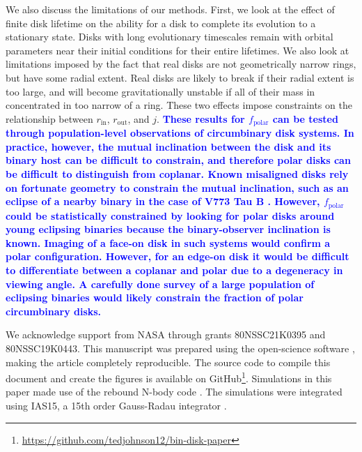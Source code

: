 \documentclass[twocolumn,linenumbers]{aastex631}
\newcommand\ghurl[0]{\url{https://github.com/tedjohnson12/bin-disk-paper}}
\newcommand{\RR}[1]{\textcolor{blue}{\bf#1}} %
\begin{document}
We also discuss the limitations of our methods. First, we look at the effect of finite disk lifetime on the ability for a disk to complete its evolution to a stationary state. Disks with long evolutionary timescales remain with orbital parameters near their initial conditions for their entire lifetimes. We also look at limitations imposed by the fact that real disks are not geometrically narrow rings, but have some radial extent. Real disks are likely to break if their radial extent is too large, and will become gravitationally unstable if all of their mass in concentrated in too narrow of a ring. These two effects impose constraints on the relationship between $r_\text{in}$, $r_\text{out}$, and $j$.
\RR{
These results for $f_\text{polar}$ can be tested through population-level observations of circumbinary disk systems. In practice, however, the mutual inclination between the disk and its binary host can be difficult to constrain, and therefore polar disks can be difficult to distinguish from coplanar. Known misaligned disks rely on fortunate geometry to constrain the mutual inclination, such as an eclipse of a nearby binary in the case of V773 Tau B \citep{kenworthy2022}. However, $f_\text{polar}$ could be statistically constrained by looking for polar disks around young eclipsing binaries because the binary-observer inclination is known. Imaging of a face-on disk in such systems would confirm a polar configuration. However, for an edge-on disk it would be difficult to differentiate between a coplanar and polar due to a degeneracy in viewing angle. A carefully done survey of a large population of eclipsing binaries \citep[e.g., those found by the Kepler Mission][]{kirk2016} would likely constrain the fraction of polar circumbinary disks.
}


\begin{acknowledgements}
\label{sec:ack}

We acknowledge support from NASA through grants 80NSSC21K0395 and 80NSSC19K0443. This manuscript was prepared using the open-science software \href{https://show-your.work/en/latest/intro/}{\showyourwork} \citep{luger2021}, making the article completely
reproducible. The source code to compile this document and create the figures is available on GitHub\footnote{\ghurl}.
Simulations in this paper made use of the {\sc rebound} N-body code \citep{rebound}.
The simulations were integrated using IAS15, a 15th order Gauss-Radau integrator \citep{reboundias15}. 

\end{acknowledgements}
\end{document}
